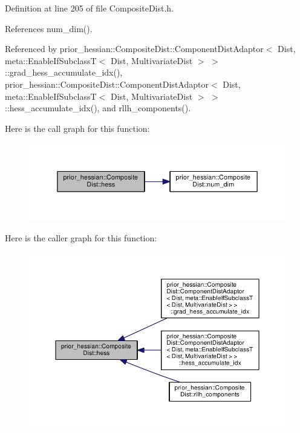 Definition at line 205 of file Composite\+Dist.\+h.



References num\+\_\+dim().



Referenced by prior\+\_\+hessian\+::\+Composite\+Dist\+::\+Component\+Dist\+Adaptor$<$ Dist, meta\+::\+Enable\+If\+Subclass\+T$<$ Dist, Multivariate\+Dist $>$ $>$\+::grad\+\_\+hess\+\_\+accumulate\+\_\+idx(), prior\+\_\+hessian\+::\+Composite\+Dist\+::\+Component\+Dist\+Adaptor$<$ Dist, meta\+::\+Enable\+If\+Subclass\+T$<$ Dist, Multivariate\+Dist $>$ $>$\+::hess\+\_\+accumulate\+\_\+idx(), and rllh\+\_\+components().



Here is the call graph for this function\+:\nopagebreak
\begin{figure}[H]
\begin{center}
\leavevmode
\includegraphics[width=350pt]{classprior__hessian_1_1CompositeDist_ab8c1ff058081ab81620e24b0e3e85f5d_cgraph}
\end{center}
\end{figure}




Here is the caller graph for this function\+:\nopagebreak
\begin{figure}[H]
\begin{center}
\leavevmode
\includegraphics[width=350pt]{classprior__hessian_1_1CompositeDist_ab8c1ff058081ab81620e24b0e3e85f5d_icgraph}
\end{center}
\end{figure}


